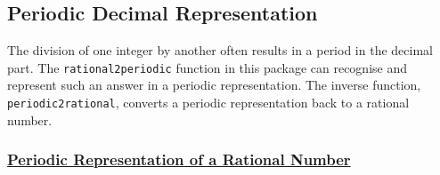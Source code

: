 

\subsection{Periodic Decimal Representation}
\label{sec:rataprx}

The division of one integer by another often results in
a period in the decimal part. The \texttt{rational2periodic}
function in this package can recognise and represent
such an answer in a periodic representation. The inverse
function, \texttt{periodic2rational}, converts a
periodic representation back to a rational number.

\hypertarget{operator:RATIONAL2PERIODIC}{}
\hypertarget{operator:PERIODIC2RATIONAL}{}
\hypertarget{operator:PERIODIC}{}

\subsubsection*{\textbf{\underline{Periodic Representation of a Rational Number}}}

